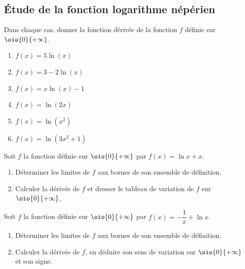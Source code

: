 \documentclass[a4paper,11pt,exos]{nsi} %
\begin{document}
\subsection*{Étude de la fonction logarithme népérien}

\exo{}
Dans chaque cas, donner la fonction dérivée de la fonction $f$ définie sur $\oio{0}{+\infty}$.
\begin{multicols}{3}
    \begin{enumerate}
        \item $f(x)=5\ln(x)$
        \item $f(x)=3-2\ln(x)$
        \item $f(x)=x\ln\left(x\right)-1$
        \item $f(x)=\ln(2x)$
        \item $f(x)=\ln\left(x^2\right)$
        \item $f(x)=\ln\left(3x^2+1\right)$
    \end{enumerate}
\end{multicols}

\exo{}
Soit $f$ la fonction définie sur $\oio{0}{+\infty}$ par $f(x)=\ln x +x$.
\begin{enumerate}
    \item Déterminer les limites de $f$ aux bornes de son ensemble de définition.
    \item Calculer la dérivée de $f$ et dresser le tableau de variation de $f$ sur $\oio{0}{+\infty}$.
\end{enumerate}

\exo{}
Soit $f$ la fonction définie sur $\oio{0}{+\infty}$ par $f(x)=-\dfrac{1}{x}+\ln x$.
\begin{enumerate}
    \item Déterminer les limites de $f$ aux bornes de son ensemble de définition.
    \item Calculer la dérivée de $f$, en déduire son sens de variation sur $\oio{0}{+\infty}$ et son signe.
\end{enumerate}

\newpage
\end{document}
